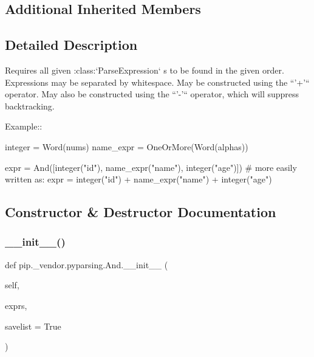 \subsection*{Additional Inherited Members}


\subsection{Detailed Description}
\begin{DoxyVerb}Requires all given :class:`ParseExpression` s to be found in the given order.
Expressions may be separated by whitespace.
May be constructed using the ``'+'`` operator.
May also be constructed using the ``'-'`` operator, which will
suppress backtracking.

Example::

    integer = Word(nums)
    name_expr = OneOrMore(Word(alphas))

    expr = And([integer("id"), name_expr("name"), integer("age")])
    # more easily written as:
    expr = integer("id") + name_expr("name") + integer("age")
\end{DoxyVerb}
 

\subsection{Constructor \& Destructor Documentation}
\mbox{\label{classpip_1_1__vendor_1_1pyparsing_1_1And_a83632fa6cb44efd158f0c82ec13cca0b}} 
\subsubsection{\texorpdfstring{\+\_\+\+\_\+init\+\_\+\+\_\+()}{\_\_init\_\_()}}
{\footnotesize\ttfamily def pip.\+\_\+vendor.\+pyparsing.\+And.\+\_\+\+\_\+init\+\_\+\+\_\+ (\begin{DoxyParamCaption}\item[{}]{self,  }\item[{}]{exprs,  }\item[{}]{savelist = {\ttfamily True} }\end{DoxyParamCaption})}



